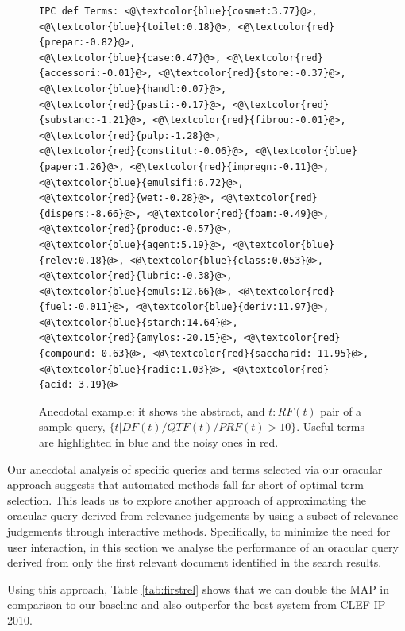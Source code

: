 \begin{figure}[t!]
\begin{framed}
\begin{lstlisting}[basicstyle=\scriptsize\ttfamily , linewidth=\columnwidth,breaklines=true]
IPC def Terms: <@\textcolor{blue}{cosmet:3.77}@>, <@\textcolor{blue}{toilet:0.18}@>, <@\textcolor{red}{prepar:-0.82}@>, 
<@\textcolor{blue}{case:0.47}@>, <@\textcolor{red}{accessori:-0.01}@>, <@\textcolor{red}{store:-0.37}@>, <@\textcolor{blue}{handl:0.07}@>, 
<@\textcolor{red}{pasti:-0.17}@>, <@\textcolor{red}{substanc:-1.21}@>, <@\textcolor{red}{fibrou:-0.01}@>, <@\textcolor{red}{pulp:-1.28}@>, 
<@\textcolor{red}{constitut:-0.06}@>, <@\textcolor{blue}{paper:1.26}@>, <@\textcolor{red}{impregn:-0.11}@>, <@\textcolor{blue}{emulsifi:6.72}@>, 
<@\textcolor{red}{wet:-0.28}@>, <@\textcolor{red}{dispers:-8.66}@>, <@\textcolor{red}{foam:-0.49}@>, <@\textcolor{red}{produc:-0.57}@>, 
<@\textcolor{blue}{agent:5.19}@>, <@\textcolor{blue}{relev:0.18}@>, <@\textcolor{blue}{class:0.053}@>, <@\textcolor{red}{lubric:-0.38}@>, 
<@\textcolor{blue}{emuls:12.66}@>, <@\textcolor{red}{fuel:-0.011}@>, <@\textcolor{blue}{deriv:11.97}@>, <@\textcolor{blue}{starch:14.64}@>, 
<@\textcolor{red}{amylos:-20.15}@>, <@\textcolor{red}{compound:-0.63}@>, <@\textcolor{red}{saccharid:-11.95}@>, 
<@\textcolor{blue}{radic:1.03}@>, <@\textcolor{red}{acid:-3.19}@> 
 \end{lstlisting} 
 \vspace*{-2ex}
\end{framed}
 \vspace*{-2ex}
  \caption{Anecdotal example: it shows the abstract, and $ t:RF(t) $ pair of a sample query, $\{t|DF(t)/QTF(t)/PRF(t)>10\}$. Useful terms are highlighted in blue and the noisy ones in red.}
  \label{fig:anecdotal}  
\end{figure}

Our anecdotal analysis of specific queries and terms selected via our oracular
approach suggests that automated methods fall far short of optimal term selection.
This leads us to explore another approach of approximating the oracular query
derived from relevance judgements by using a subset of relevance judgements
through interactive methods.  Specifically, to minimize the need for user interaction,
in this section we analyse the performance of an oracular query derived from
only the first relevant document identified in the search results.

Using this approach, Table \ref{tab:firstrel} shows that we can double the MAP in comparison to our baseline and also outperfor the best system from CLEF-IP 2010.

